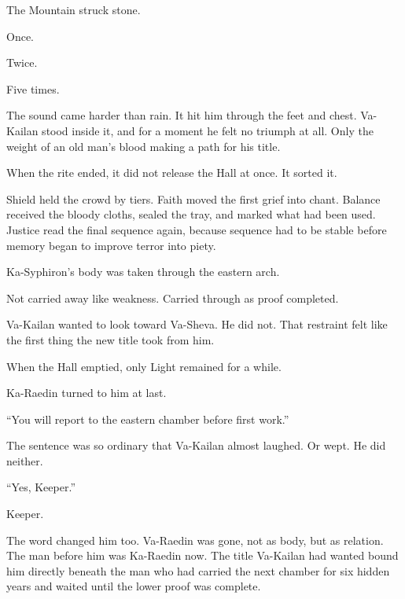 The Mountain struck stone.\par

Once.\par

Twice.\par

Five times.\par

The sound came harder than rain. It hit him through the feet and chest. Va-Kailan stood inside it, and for a moment he felt no triumph at all. Only the weight of an old man’s blood making a path for his title.\par

When the rite ended, it did not release the Hall at once. It sorted it.\par

Shield held the crowd by tiers. Faith moved the first grief into chant. Balance received the bloody cloths, sealed the tray, and marked what had been used. Justice read the final sequence again, because sequence had to be stable before memory began to improve terror into piety.\par

Ka-Syphiron’s body was taken through the eastern arch.\par

Not carried away like weakness. Carried through as proof completed.\par

Va-Kailan wanted to look toward Va-Sheva. He did not. That restraint felt like the first thing the new title took from him.\par

When the Hall emptied, only Light remained for a while.\par

Ka-Raedin turned to him at last.\par

“You will report to the eastern chamber before first work.”\par

The sentence was so ordinary that Va-Kailan almost laughed. Or wept. He did neither.\par

“Yes, Keeper.”\par

Keeper.\par

The word changed him too. Va-Raedin was gone, not as body, but as relation. The man before him was Ka-Raedin now. The title Va-Kailan had wanted bound him directly beneath the man who had carried the next chamber for six hidden years and waited until the lower proof was complete.\par

